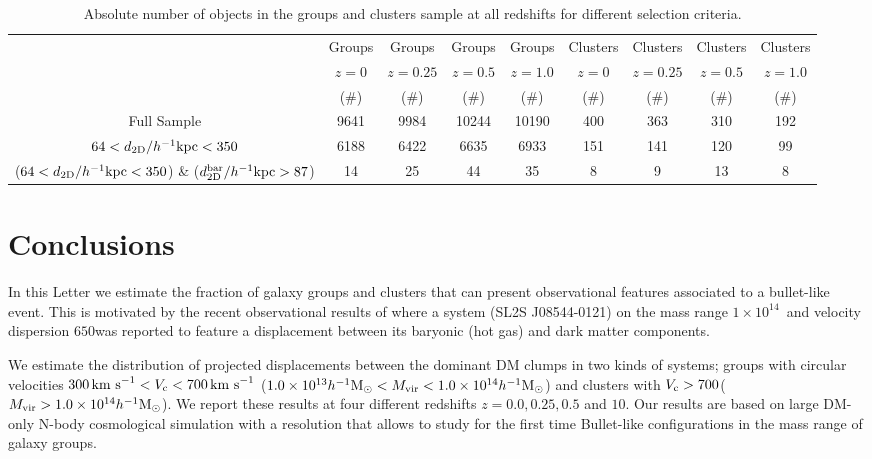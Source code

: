 \documentclass{emulateapj}
\newcommand{\hkpc}{{\ifmmode{h^{-1}{\rm kpc}}\else{$h^{-1}$kpc }\fi}}
\newcommand{\hMsun}{{\ifmmode{h^{-1}{\rm {M_{\odot}}}}\else{$h^{-1}{\rm{M_{\odot}}}$}\fi}}
\newcommand{\kms}{{\ifmmode{{\mathrm{\,km\ s}^{-1}}}\else{\,km~s$^{-1}$}\fi}}
\newcommand{\bullg}{SL2S J08544-0121}
\begin{document}
\begin{table}
\begin{center}
\begin{tabular}{ccccccccc}\hline\hline
        & Groups & Groups & Groups & Groups & Clusters & Clusters & Clusters & Clusters\\
  & $z=0$   & $z=0.25$   & $z=0.5$   & $z=1.0$   & $z=0$   & $z=0.25$   & $z=0.5$   & $z=1.0$ \\
  & ($\# $)    & ($\# $)    & ($\# $)    & ($\# $)    & ($\# $)    & ($\# $)    & ($\# $)    & ($\# $)  \\\hline
Full Sample & 9641 & 9984 & 10244 & 10190 & 400  & 363 & 310 & 192 \\
$64 <d_{\rm 2D}/\hkpc< 350$ & 6188 & 6422 & 6635 & 6933 & 151 &
141 & 120 & 99\\
($64 <d_{\rm 2D}/\hkpc< 350 $) \& ($d_{\rm 2D}^{\rm bar}/\hkpc >87$) & 14 & 25 & 44 & 35 & 8 & 9 & 13 & 8 \\\hline\hline
\end{tabular}
\caption{Absolute number of objects in the groups and clusters sample
  at all redshifts for different selection criteria. }
\label{table:numbers}
\end{center}
\end{table}





\section{Conclusions}
\label{sec:conclusions}

In this Letter we estimate the fraction of galaxy groups and clusters that
can present observational features associated to a bullet-like
event. This is motivated by the recent observational results of
\citep{Gastaldello} where a system (\bullg) on the mass range $1\times
10^{14}$\hMsun\ and velocity dispersion $650$\kms was reported to
feature a displacement between its baryonic (hot gas) and dark matter
components.  


We estimate the distribution of projected displacements
between the dominant DM clumps in two kinds of systems; groups with
circular velocities $300\kms<V_{\rm c}<700\kms$ ($1.0\times
10^{13}\hMsun < M_{\rm vir}<1.0\times 10^{14}\hMsun$) and clusters with $V_{\rm
  c}>700$\kms ($M_{\rm vir}>1.0\times 10^{14}\hMsun$). We report these
results at four different redshifts $z=0.0,0.25,0.5$ and $10$. Our
results are based on large DM-only N-body cosmological simulation with
a resolution that allows to study for the first time Bullet-like
configurations in the mass range of galaxy groups. 
\end{document}
